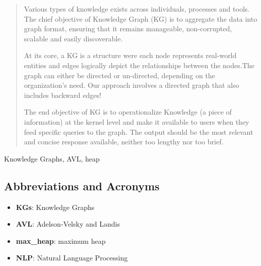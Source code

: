 \documentclass[conference]{IEEEtran}
\begin{document}
\begin{abstract}
Various types of knowledge exists across individuals, processes and tools.
The chief objective of Knowledge Graph (KG) is to aggregate the data into graph format, ensuring that it remains manageable, non-corrupted, scalable and easily discoverable.

At its core, a KG is a structure were each node represents real-world entities and edges logically depict the relationships between the nodes.The graph can either be directed or un-directed, depending on the organization's need. Our approach involves a directed graph that also includes backward edges!

The end objective of KG is to operationalize Knowledge (a piece of information) at the kernel level and make it available to users when they feed specific queries to the graph. The output should be the most relevant and concise response available, neither too lengthy nor too brief.
\end{abstract}

\begin{IEEEkeywords}
Knowledge Graphs, AVL, heap
\end{IEEEkeywords}

\subsection{Abbreviations and Acronyms}\label{AA}

\begin{itemize}
    \item \textbf{KGs}: Knowledge Graphs
    \item \textbf{AVL}: Adelson-Velsky and Landis
    \item \textbf{max\_heap}: maximum heap
    \item \textbf{NLP}: Natural Language Processing
\end{itemize}
\end{document}
